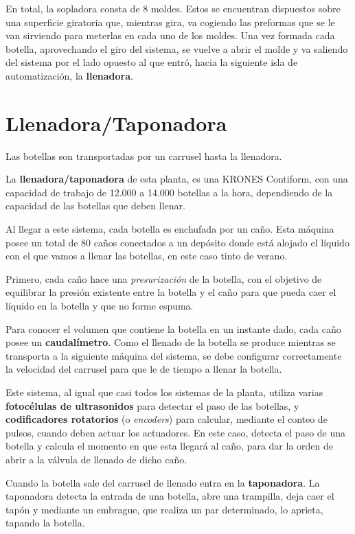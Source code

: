 \documentclass[11pt,a4paper,spanish,twoside]{report}
\begin{document}
En total, la sopladora consta de 8 moldes. Estos se encuentran dispuestos 
sobre una superficie giratoria que, mientras gira, va cogiendo las preformas 
que se le van sirviendo para meterlas en cada uno de los moldes. Una vez 
formada cada botella, aprovechando el giro del sistema, se vuelve a abrir el 
molde y va saliendo del sistema por el lado opuesto al que entró, hacia la 
siguiente isla de automatización, la \textbf{llenadora}.

\section{Llenadora/Taponadora}
Las botellas son transportadas por un carrusel hasta la llenadora.

La \textbf{llenadora/taponadora} de esta planta, es una KRONES Contiform, con 
una capacidad de trabajo de 12.000 a 14.000 botellas a la hora, dependiendo de
la capacidad de las botellas que deben llenar.

Al llegar a este sistema, cada botella es enchufada por un caño. Esta máquina 
posee un total de 80 caños conectados a un depósito donde está alojado el 
líquido con el que vamos a llenar las botellas, en este caso tinto de verano.

Primero, cada caño hace una \emph{presurización} de la botella, con el 
objetivo de equilibrar la presión existente entre la botella y el caño para 
que pueda caer el líquido en la botella y que no forme espuma.

Para conocer el volumen que contiene la botella en un instante dado, cada caño 
posee un \textbf{caudalímetro}. Como el llenado de la botella se produce
mientras se transporta a la siguiente máquina del sistema, se debe configurar
correctamente la velocidad del carrusel para que le de tiempo a llenar la 
botella.

Este sistema, al igual que casi todos los sistemas de la planta, utiliza 
varias \textbf{fotocélulas de ultrasonidos} para detectar el paso de las 
botellas, y \textbf{codificadores rotatorios} (o \emph{\emph{encoder}s}) para 
calcular, mediante el conteo de pulsos, cuando deben actuar los actuadores. 
En este caso, detecta el paso de una botella y calcula el momento en que esta 
llegará al caño, para dar la orden de abrir a la válvula de llenado de dicho 
caño.

Cuando la botella sale del carrusel de llenado entra en la \textbf{taponadora}.
La taponadora detecta la entrada de una botella, abre una trampilla, deja caer 
el tapón y mediante un embrague, que realiza un par determinado, lo aprieta, 
tapando la botella.
\end{document}
